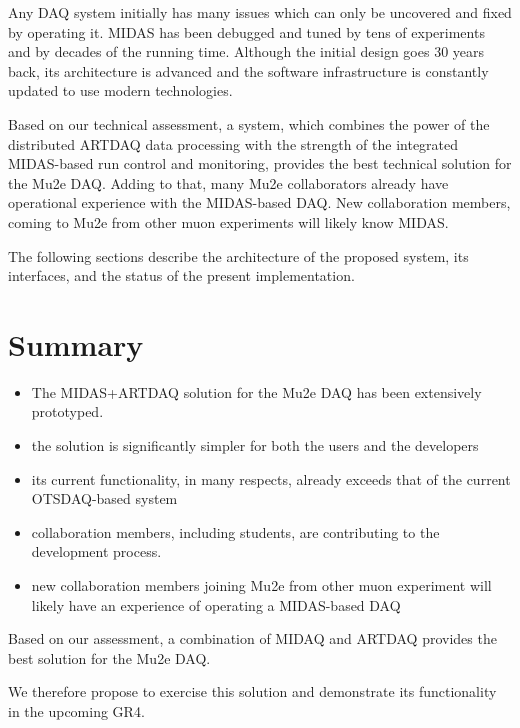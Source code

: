 \documentclass[12pt]{article}
\begin{document}
Any DAQ system initially has many issues which can only be uncovered and fixed
by operating it. MIDAS has been debugged and tuned by tens of experiments
and by decades of the running time. Although the initial design goes 30 years back,
its architecture is advanced and the software infrastructure is constantly updated
to use modern technologies.

Based on our technical assessment, a system, which combines the power of
the distributed ARTDAQ data processing with the strength of the integrated
MIDAS-based run control and monitoring, provides the best technical solution
for the Mu2e DAQ.
%
Adding to that, many Mu2e collaborators already have operational experience with
the MIDAS-based DAQ. New collaboration members, coming to Mu2e from other muon 
experiments will likely know MIDAS.

The following sections describe the architecture of the proposed system,
its interfaces, and the status of the present implementation.



% 




\section {Summary}

\begin{itemize}
\item 
  The MIDAS+ARTDAQ solution for the Mu2e DAQ has been extensively prototyped.
\item
  the solution is significantly simpler for both the users and the developers
\item
  its current functionality, in many respects, already exceeds that
  of the current OTSDAQ-based system  
\item
  collaboration members, including students, are contributing
  to the development process. 
\item
  new collaboration members joining Mu2e from other muon experiment will
  likely have an experience of operating a MIDAS-based DAQ
\end{itemize}

Based on our assessment, a combination of MIDAQ and  ARTDAQ
provides the best solution for the Mu2e DAQ.

We therefore propose to exercise this solution and demonstrate
its functionality in the upcoming GR4.

%
\newpage



% 

\end{document}
